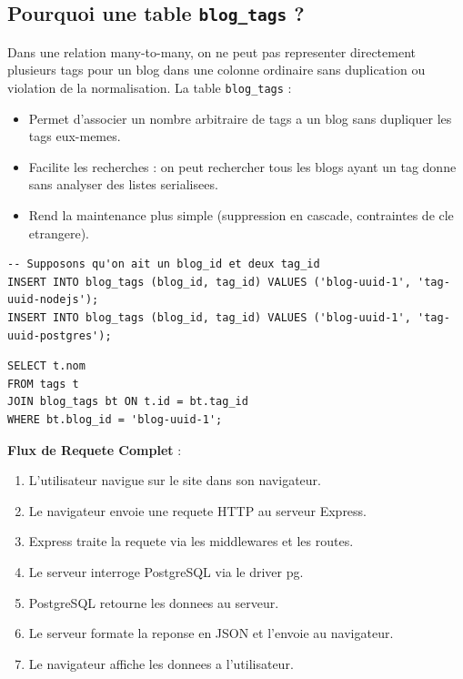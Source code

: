 \documentclass[a4paper,12pt]{book}
\begin{document}
\subsection{Pourquoi une table \texttt{blog\_tags} ?}

Dans une relation many-to-many, on ne peut pas representer directement plusieurs tags pour un blog dans une colonne ordinaire sans duplication ou violation de la normalisation. La table \texttt{blog\_tags} :

\begin{itemize}
    \item Permet d'associer un nombre arbitraire de tags a un blog sans dupliquer les tags eux-memes.
    \item Facilite les recherches : on peut rechercher tous les blogs ayant un tag donne sans analyser des listes serialisees.
    \item Rend la maintenance plus simple (suppression en cascade, contraintes de cle etrangere).
\end{itemize}

\begin{lstlisting}[style=sql,caption=Exemple - lier un blog a deux tags]
-- Supposons qu'on ait un blog_id et deux tag_id
INSERT INTO blog_tags (blog_id, tag_id) VALUES ('blog-uuid-1', 'tag-uuid-nodejs');
INSERT INTO blog_tags (blog_id, tag_id) VALUES ('blog-uuid-1', 'tag-uuid-postgres');
\end{lstlisting}

\begin{lstlisting}[style=sql,caption=Exemple - recuperer les tags d'un blog]
SELECT t.nom
FROM tags t
JOIN blog_tags bt ON t.id = bt.tag_id
WHERE bt.blog_id = 'blog-uuid-1';
\end{lstlisting}


\begin{architecturebox}
    \textbf{Flux de Requete Complet} :
    \begin{enumerate}
        \item L'utilisateur navigue sur le site dans son navigateur.
        \item Le navigateur envoie une requete HTTP au serveur Express.
        \item Express traite la requete via les middlewares et les routes.
        \item Le serveur interroge PostgreSQL via le driver pg.
        \item PostgreSQL retourne les donnees au serveur.
        \item Le serveur formate la reponse en JSON et l'envoie au navigateur.
        \item Le navigateur affiche les donnees a l'utilisateur.
    \end{enumerate}
\end{architecturebox}
\end{document}

